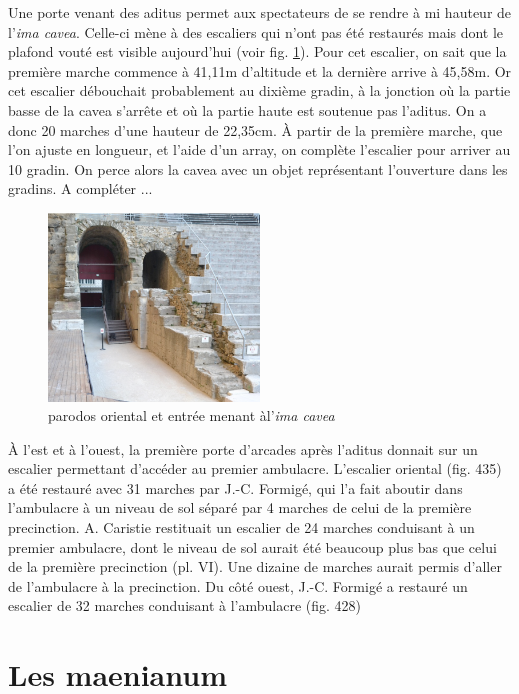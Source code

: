 Une porte venant des aditus permet aux spectateurs de se rendre à mi hauteur de l'\textit{ima cavea}. Celle-ci mène à des escaliers qui n'ont pas été restaurés mais dont le plafond vouté est visible aujourd'hui (voir fig. \ref{parodos}). Pour cet escalier, on sait que la première marche commence à 41,11m d'altitude et la dernière arrive à 45,58m. Or cet escalier débouchait probablement au dixième gradin, à la jonction où la partie basse de la cavea s'arrête et où la partie haute est soutenue pas l'aditus. On a donc 20 marches d'une hauteur de 22,35cm. \`{A} partir de la première marche, que l'on ajuste en longueur, et l'aide d'un \gls{array}, on complète l'escalier pour arriver au 10 gradin. On perce alors la cavea avec un objet représentant l'ouverture dans les gradins. A compléter ...


\begin{figure}[!h]
	\centering
	\includegraphics[width=0.5\textwidth]{images/parodos}
	\caption[\Gls{parodos} oriental et entrée menant àl'\textit{ima cavea}]{\Gls{parodos} oriental et entrée menant àl'\textit{ima cavea} \cite[fig. 418]{orangeTxt}} 
	\label{parodos} 
\end{figure}

\`{A} l'est et à l'ouest, la première porte d'arcades après l'\gls{aditus} donnait sur un escalier permettant d'accéder au premier \gls{ambulacre}. L'escalier oriental (fig. 435) a été restauré avec 31 marches par J.-C. Formigé, qui l'a fait aboutir dans l'ambulacre à un niveau de sol séparé par 4 marches de celui de la première precinction. A. Caristie restituait un escalier de 24 marches conduisant à un premier ambulacre, dont le niveau de sol aurait été beaucoup plus bas que celui de la première precinction (pl. VI). Une dizaine de
marches aurait permis d'aller de l'ambulacre à la precinction.
Du côté ouest, J.-C. Formigé a restauré un escalier de 32 marches conduisant à
l'ambulacre (fig. 428)


		\section{Les maenianum} \label{sect-maenianum}

